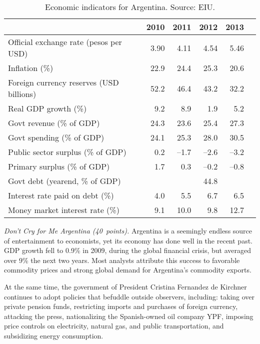 \documentclass[letterpaper,12pt]{exam}
\begin{document}
\begin{questions}
\begin{table}[h]
\centering
\tabcolsep=0.1in
\begin{tabular}{lrrrrr}
\toprule
                & 2010 & 2011 & 2012 & 2013 \\
\midrule
Official exchange rate (pesos per USD)  & 3.90 & 4.11 & 4.54 & 5.46  \\
Inflation (\%)              & 22.9 & 24.4 & 25.3 & 20.6 \\
Foreign currency reserves (USD billions) & 52.2 & 46.4 & 43.2 & 32.2 \\
Real GDP growth (\%)        & 9.2 & 8.9 & 1.9 & 5.2  \\
Govt revenue (\% of GDP)    & 24.3 & 23.6 & 25.4 & 27.3 \\
Govt spending (\% of GDP)   & 24.1 & 25.3 & 28.0 & 30.5  \\
Public sector surplus (\% of GDP) & 0.2 & --1.7 & --2.6 & --3.2 \\
Primary surplus (\% of GDP) &  1.7 & 0.3 & --0.2 & --0.8   \\
Govt debt (yearend, \% of GDP)  & & & 44.8\\
Interest rate paid on debt (\%) & 4.0 & 5.5 & 6.7 & 6.5  \\
Money market interest rate (\%) & 9.1 & 10.0 & 9.8 & 12.7 \\
\bottomrule
\end{tabular}
\label{tab:portugal}
\caption{Economic indicators for Argentina.  Source:  EIU.}
\end{table}

\item  {\it Don't Cry for Me Argentina (40~points).\/}
Argentina is a seemingly endless source of entertainment to economists,
yet its economy has done well in the recent past.
GDP growth fell to 0.9\% in 2009, during the global financial crisis,
but averaged over 9\% the next two years.
Most analysts attribute this success to
favorable commodity prices and strong global demand for Argentina's commodity exports.

At the same time, the government of President Cristina Fernandez de Kirchner
continues to adopt policies that befuddle outside observers, including:
taking over private pension funds,
restricting imports and purchases of foreign currency,
attacking the press,
nationalizing the Spanish-owned oil company YPF,
imposing price controls on electricity, natural gas, and public transportation,
and subsidizing energy consumption.


\end{questions}
\end{document}
